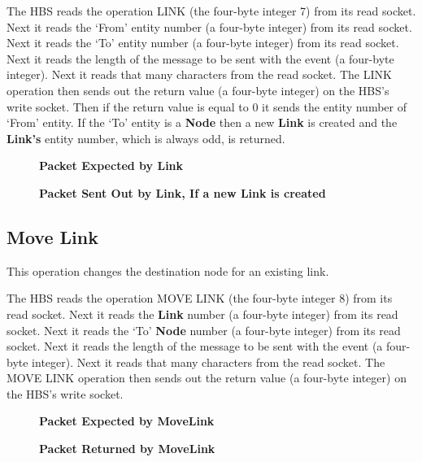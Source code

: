 The HBS reads the operation LINK (the four-byte integer 7) from its read
socket.  Next it reads the `From' entity number (a four-byte integer) from
its read socket.  Next it reads the `To' entity number (a four-byte
integer) from its read socket.  Next it reads the length of the
message to be sent with the event (a four-byte integer).  Next it reads
that many characters from the read socket.  The LINK operation then
sends out the return value (a four-byte integer) on the HBS's write socket.
Then if the return value is equal to 0 it sends the entity number of `From'
entity.  If the `To' entity is a {\bf Node} then a new {\bf Link} is
created and the {\bf Link's} entity number, which is always odd, is
returned.

\begin{figure}[htb]
  \centerline{}
  \caption{{\bf Packet Expected by Link}}
  \label{fig:Link1}
\end{figure}

\begin{figure}[htb]
  \centerline{}
  \caption{{\bf Packet Sent Out by Link, If a new Link is created}}
  \label{fig:Link2}
\end{figure}

\newpage
\subsection{Move Link}

This operation changes the destination node for an existing link.  

The HBS reads the operation MOVE LINK (the four-byte integer 8) from its
read socket.  Next it reads the {\bf Link} number (a four-byte integer)
from its read socket.  Next it reads the `To' {\bf Node} number (a
four-byte integer) from its read socket.  Next it reads the length of
the message to be sent with the event (a four-byte integer).  Next it reads
that many characters from the read socket.  The MOVE LINK operation then
sends out the return value (a four-byte integer) on the HBS's write socket.

\begin{figure}[htb]
  \centerline{}
  \caption{{\bf Packet Expected by MoveLink}}
  \label{fig:MoveLink1}
\end{figure}


\begin{figure}[htb]
  \centerline{}
  \caption{{\bf Packet Returned by MoveLink}}
  \label{fig:MoveLink2}
\end{figure}

